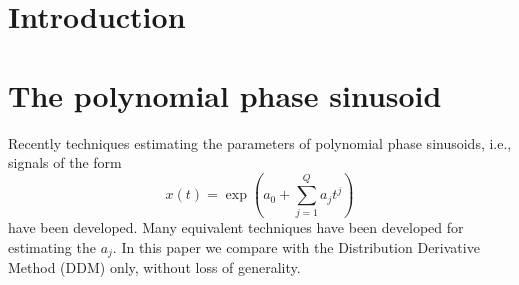 \documentclass[twoside,a4paper]{article}
\title{\papertitle}
\newif\ifpdf
\begin{document}
\ifpdf %
  \DeclareGraphicsExtensions{.png,.jpg,.pdf}
\else  %
\fi

\maketitle

\begin{abstract}
TODO
\end{abstract}

\section{Introduction}
\label{sec:intro}
%
%
%
\section{The polynomial phase sinusoid}
Recently techniques estimating the parameters of polynomial phase sinusoids,
i.e., signals of the form
\[
    x(t) = \exp(a_0 + \sum_{j=1}^{Q} a_j t^j)
\]
have been developed. Many equivalent techniques have been developed for
estimating the $a_j$. In this paper we compare with the
Distribution Derivative Method (DDM) only, without loss of generality.
\end{document}
